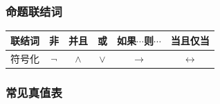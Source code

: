 \subsubsection{命题联结词}

\begin{center}
	\begin{tabular}{|c|c|c|c|c|c|}
		\hline
		联结词 & 非 & 并且 & 或 & 如果$\cdots$则$\cdots$ & 当且仅当 \\
		\hline
		符号化 & $\neg$ & $\land$ & $\lor$ & $\to$ & $\leftrightarrow$ \\
		\hline
	\end{tabular}
\end{center}
\subsubsection{常见真值表}

